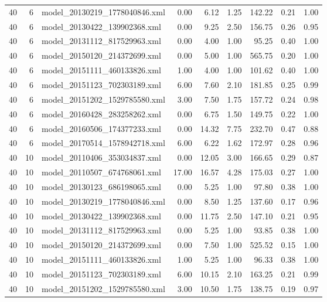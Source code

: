 \begin{table}[ht]
\begin{tabular}{rrlrrrrrr}
   40 &   6 & model\_20130219\_1778040846.xml & 0.00 & 6.12 & 1.25 & 142.22 & 0.21 & 1.00 \\ 
   40 &   6 & model\_20130422\_139902368.xml & 0.00 & 9.25 & 2.50 & 156.75 & 0.26 & 0.95 \\ 
   40 &   6 & model\_20131112\_817529963.xml & 0.00 & 4.00 & 1.00 & 95.25 & 0.40 & 1.00 \\ 
   40 &   6 & model\_20150120\_214372699.xml & 0.00 & 5.00 & 1.00 & 565.75 & 0.20 & 1.00 \\ 
   40 &   6 & model\_20151111\_460133826.xml & 1.00 & 4.00 & 1.00 & 101.62 & 0.40 & 1.00 \\ 
   40 &   6 & model\_20151123\_702303189.xml & 6.00 & 7.60 & 2.10 & 181.85 & 0.25 & 0.99 \\ 
   40 &   6 & model\_20151202\_1529785580.xml & 3.00 & 7.50 & 1.75 & 157.72 & 0.24 & 0.98 \\ 
   40 &   6 & model\_20160428\_283258262.xml & 0.00 & 6.75 & 1.50 & 149.75 & 0.22 & 1.00 \\ 
   40 &   6 & model\_20160506\_174377233.xml & 0.00 & 14.32 & 7.75 & 232.70 & 0.47 & 0.88 \\ 
   40 &   6 & model\_20170514\_1578942718.xml & 6.00 & 6.22 & 1.62 & 172.97 & 0.28 & 0.96 \\ 
   40 &  10 & model\_20110406\_353034837.xml & 0.00 & 12.05 & 3.00 & 166.65 & 0.29 & 0.87 \\ 
   40 &  10 & model\_20110507\_674768061.xml & 17.00 & 16.57 & 4.28 & 175.03 & 0.27 & 1.00 \\ 
   40 &  10 & model\_20130123\_686198065.xml & 0.00 & 5.25 & 1.00 & 97.80 & 0.38 & 1.00 \\ 
   40 &  10 & model\_20130219\_1778040846.xml & 0.00 & 8.50 & 1.25 & 137.60 & 0.17 & 0.96 \\ 
   40 &  10 & model\_20130422\_139902368.xml & 0.00 & 11.75 & 2.50 & 147.10 & 0.21 & 0.95 \\ 
   40 &  10 & model\_20131112\_817529963.xml & 0.00 & 5.25 & 1.00 & 93.85 & 0.38 & 1.00 \\ 
   40 &  10 & model\_20150120\_214372699.xml & 0.00 & 7.50 & 1.00 & 525.52 & 0.15 & 1.00 \\ 
   40 &  10 & model\_20151111\_460133826.xml & 1.00 & 5.25 & 1.00 & 96.33 & 0.38 & 1.00 \\ 
   40 &  10 & model\_20151123\_702303189.xml & 6.00 & 10.15 & 2.10 & 163.25 & 0.21 & 0.99 \\ 
   40 &  10 & model\_20151202\_1529785580.xml & 3.00 & 10.50 & 1.75 & 138.75 & 0.19 & 0.97 \\ 

\end{tabular}
\end{table}
